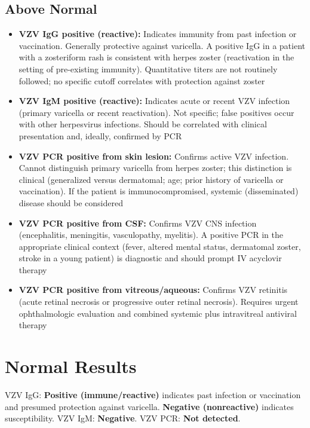 \subsection*{Above Normal}
\begin{itemize}
  \item \textbf{VZV IgG positive (reactive):} Indicates immunity from past infection or vaccination. Generally protective against varicella. A positive IgG in a patient with a zosteriform rash is consistent with herpes zoster (reactivation in the setting of pre-existing immunity). Quantitative titers are not routinely followed; no specific cutoff correlates with protection against zoster
  \item \textbf{VZV IgM positive (reactive):} Indicates acute or recent VZV infection (primary varicella or recent reactivation). Not specific; false positives occur with other herpesvirus infections. Should be correlated with clinical presentation and, ideally, confirmed by PCR
  \item \textbf{VZV PCR positive from skin lesion:} Confirms active VZV infection. Cannot distinguish primary varicella from herpes zoster; this distinction is clinical (generalized versus dermatomal; age; prior history of varicella or vaccination). If the patient is immunocompromised, systemic (disseminated) disease should be considered
  \item \textbf{VZV PCR positive from CSF:} Confirms VZV CNS infection (encephalitis, meningitis, vasculopathy, myelitis). A positive PCR in the appropriate clinical context (fever, altered mental status, dermatomal zoster, stroke in a young patient) is diagnostic and should prompt IV acyclovir therapy
  \item \textbf{VZV PCR positive from vitreous/aqueous:} Confirms VZV retinitis (acute retinal necrosis or progressive outer retinal necrosis). Requires urgent ophthalmologic evaluation and combined systemic plus intravitreal antiviral therapy
\end{itemize}

\section*{Normal Results}
VZV IgG: \textbf{Positive (immune/reactive)} indicates past infection or vaccination and presumed protection against varicella. \textbf{Negative (nonreactive)} indicates susceptibility. VZV IgM: \textbf{Negative}. VZV PCR: \textbf{Not detected}.

